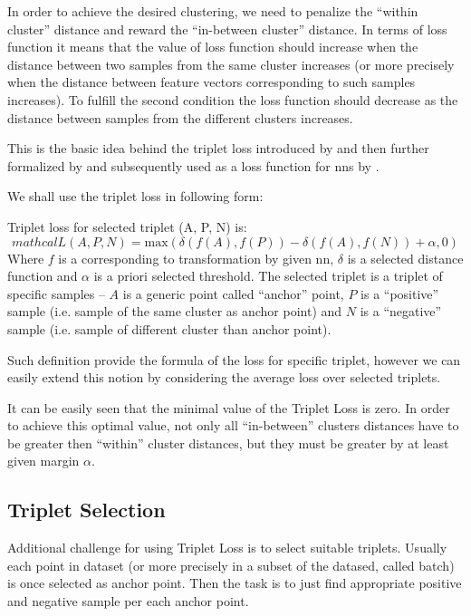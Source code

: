 In order to achieve the desired clustering, we need to penalize the ``within
cluster'' distance and reward the ``in-between cluster'' distance. In terms
of loss function it means that the value of loss function should increase
when the distance between two samples from the same cluster increases (or more
precisely when the distance between feature vectors corresponding to such
samples increases). To fulfill the second condition the loss function should
decrease as the distance between samples from the different clusters increases.

This is the basic idea behind the triplet loss introduced by
\cite{tripletlossfirst} and then further formalized by \cite{tripletlosssecond}
and subsequently used as a loss function for \glspl{nn} by \cite{tripletlossnn}.

We shall use the triplet loss in following form:
\begin{defn}
Triplet loss for selected triplet (A, P, N) is:
\begin{equation}
mathcal{L}(A, P, N) = \text{max}(\delta(f(A), f(P)) - \delta(f(A), f(N)) + \alpha, 0)
\label{eq:triplet}
\end{equation}
Where $f$ is a corresponding to transformation by given \gls{nn}, $\delta$
is a selected distance function and $\alpha$ is a priori selected threshold. The
selected triplet is a triplet of specific samples -- $A$ is a generic point
called ``anchor'' point, $P$ is a ``positive'' sample (i.e. sample of the same
cluster as anchor point) and $N$ is a ``negative'' sample (i.e. sample of
different cluster than anchor point).
\end{defn}

Such definition provide the formula of the loss for specific triplet, however
we can easily extend this notion by considering the average loss over selected
triplets.

It can be easily seen that the minimal value of the Triplet Loss is zero.
In order to achieve this optimal value, not only all ``in-between'' clusters
distances have to be greater then ``within'' cluster distances, but they
must be greater by at least given margin $\alpha$.

\subsection{Triplet Selection}

Additional challenge for using Triplet Loss is to select suitable triplets.
Usually each point in dataset (or more precisely in a subset of the datased,
called batch) is once selected as anchor point. Then the task is to just find
appropriate positive and negative sample per each anchor point.

